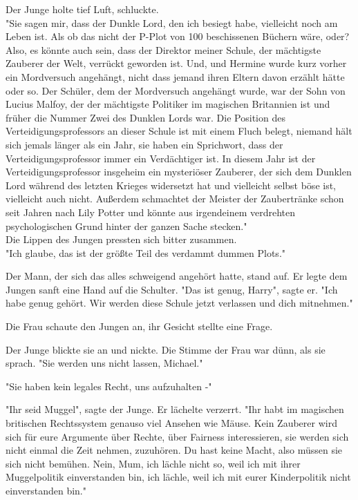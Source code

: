 {Der Junge holte tief Luft, schluckte.\\ "Sie sagen mir, dass der Dunkle Lord, den ich besiegt habe, vielleicht noch am Leben ist. Als ob das nicht der P-Plot von 100 beschissenen Büchern wäre, oder? Also, es könnte auch sein, dass der Direktor meiner Schule, der mächtigste Zauberer der Welt, verrückt geworden ist. Und, und Hermine wurde kurz vorher ein Mordversuch angehängt, nicht dass jemand ihren Eltern davon erzählt hätte oder so. Der Schüler, dem der Mordversuch angehängt wurde, war der Sohn von Lucius Malfoy, der der mächtigste Politiker im magischen Britannien ist und früher die Nummer Zwei des Dunklen Lords war. Die Position des Verteidigungsprofessors an dieser Schule ist mit einem Fluch belegt, niemand hält sich jemals länger als ein Jahr, sie haben ein Sprichwort, dass der Verteidigungsprofessor immer ein Verdächtiger ist. In diesem Jahr ist der Verteidigungsprofessor insgeheim ein mysteriöser Zauberer, der sich dem Dunklen Lord während des letzten Krieges widersetzt hat und vielleicht selbst böse ist, vielleicht auch nicht. Außerdem schmachtet der Meister der Zaubertränke schon seit Jahren nach Lily Potter und könnte aus irgendeinem verdrehten psychologischen Grund hinter der ganzen Sache stecken."\\ Die Lippen des Jungen pressten sich bitter zusammen.\\ "Ich glaube, das ist der größte Teil des verdammt dummen Plots."

Der Mann, der sich das alles schweigend angehört hatte, stand auf. Er legte dem Jungen sanft eine Hand auf die Schulter. "Das ist genug, Harry", sagte er. "Ich habe genug gehört. Wir werden diese Schule jetzt verlassen und dich mitnehmen."

Die Frau schaute den Jungen an, ihr Gesicht stellte eine Frage.

Der Junge blickte sie an und nickte. Die Stimme der Frau war dünn, als sie sprach. "Sie werden uns nicht lassen, Michael."

"Sie haben kein legales Recht, uns aufzuhalten -"

"Ihr seid Muggel", sagte der Junge. Er lächelte verzerrt. "Ihr habt im magischen britischen Rechtssystem genauso viel Ansehen wie Mäuse. Kein Zauberer wird sich für eure Argumente über Rechte, über Fairness interessieren, sie werden sich nicht einmal die Zeit nehmen, zuzuhören. Du hast keine Macht, also müssen sie sich nicht bemühen. Nein, Mum, ich lächle nicht so, weil ich mit ihrer Muggelpolitik einverstanden bin, ich lächle, weil ich mit eurer Kinderpolitik nicht einverstanden bin."

}
